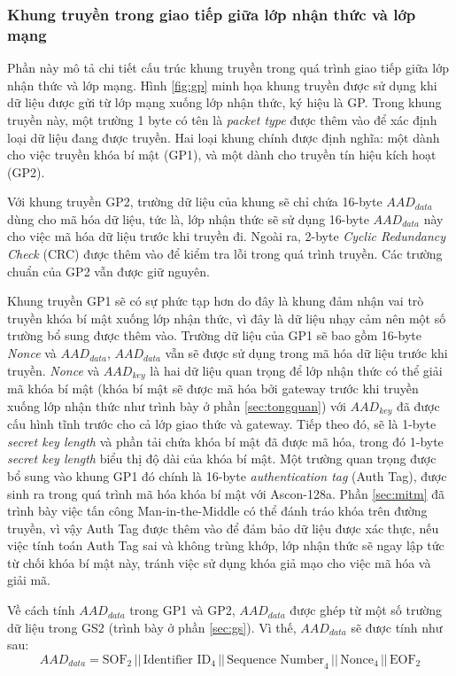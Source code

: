 \subsubsection{Khung truyền trong giao tiếp giữa lớp nhận thức và lớp mạng}
Phần này mô tả chi tiết cấu trúc khung truyền trong quá trình giao tiếp giữa lớp nhận thức và lớp mạng. Hình \ref{fig:gp} minh họa khung truyền được sử dụng khi dữ liệu được gửi từ lớp mạng xuống lớp nhận thức, ký hiệu là GP. Trong khung truyền này, một trường 1 byte có tên là \textit{packet type} được thêm vào để xác định loại dữ liệu đang được truyền. Hai loại khung chính được định nghĩa: một dành cho việc truyền khóa bí mật (GP1), và một dành cho truyền tín hiệu kích hoạt (GP2). 

Với khung truyền GP2, trường dữ liệu của khung sẽ chỉ chứa 16-byte $AAD_{data}$ dùng cho mã hóa dữ liệu, tức là, lớp nhận thức sẽ sử dụng 16-byte $AAD_{data}$ này cho việc mã hóa dữ liệu trước khi truyền đi. Ngoài ra, 2-byte \textit{Cyclic Redundancy Check} (CRC) được thêm vào để kiểm tra lỗi trong quá trình truyền. Các trường chuẩn của GP2 vẫn được giữ nguyên.

Khung truyền GP1 sẽ có sự phức tạp hơn do đây là khung đảm nhận vai trò truyền khóa bí mật xuống lớp nhận thức, vì đây là dữ liệu nhạy cảm nên một số trường bổ sung được thêm vào. Trường dữ liệu của GP1 sẽ bao gồm 16-byte \textit{Nonce} và $AAD_{data}$, $AAD_{data}$ vẫn sẽ được sử dụng trong mã hóa dữ liệu trước khi truyền. \textit{Nonce} và $AAD_{key}$ là hai dữ liệu quan trọng để lớp nhận thức có thể giải mã khóa bí mật (khóa bí mật sẽ được mã hóa bởi gateway trước khi truyền xuống lớp nhận thức như trình bày ở phần \ref{sec:tongquan}) với $AAD_{key}$ đã được cấu hình tĩnh trước cho cả lớp giao thức và gateway. Tiếp theo đó, sẽ là 1-byte \textit{secret key length} và phần tải chứa khóa bí mật đã được mã hóa, trong đó 1-byte \textit{secret key length} biểu thị độ dài của khóa bí mật. Một trường quan trọng được bổ sung vào khung GP1 đó chính là 16-byte \textit{authentication tag} (Auth Tag), được sinh ra trong quá trình mã hóa khóa bí mật với Ascon-128a. Phần \ref{sec:mitm} đã trình bày việc tấn công Man-in-the-Middle có thể đánh tráo khóa trên đường truyền, vì vậy Auth Tag được thêm vào để đảm bảo dữ liệu được xác thực, nếu việc tính toán Auth Tag sai và không trùng khớp, lớp nhận thức sẽ ngay lập tức từ chối khóa bí mật này, tránh việc sử dụng khóa giả mạo cho việc mã hóa và giải mã.

Về cách tính $AAD_{data}$ trong GP1 và GP2, $AAD_{data}$ được ghép từ một số trường dữ liệu trong GS2 (trình bày ở phần \ref{sec:gs}). Vì thế, $AAD_{data}$ sẽ được tính như sau:
\[
\text{$AAD_{data}$} = \text{SOF}_{2} \, || \, \text{Identifier ID}_{4} \, || \, \text{Sequence Number}_{4} \, || \, \text{Nonce}_{4} \, || \, \text{EOF}_{2}
\]

